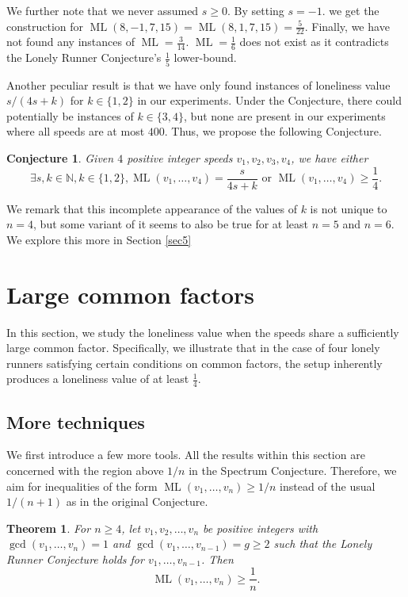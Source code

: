 \documentclass[11pt]{amsart}
\newtheorem{theorem}{Theorem}[section]
\newtheorem{conj}{Conjecture}[section]
\DeclareMathOperator{\ML}{ML}
\begin{document}
 \par We further note that we never assumed $s \geq 0$. By setting $s = -1$. we get the construction for $\ML(8, -1, 7, 15) = \ML(8, 1, 7, 15) = \frac{5}{22}$. Finally, we have not found any instances of $\ML = \frac{3}{14}$. $\ML = \frac{1}{6}$ does not exist as it contradicts the Lonely Runner Conjecture's $\frac{1}{5}$ lower-bound.
\par Another peculiar result is that we have only found instances of loneliness value $s / (4s + k)$ for $k \in \{1,2\}$ in our experiments. Under the Conjecture, there could potentially be instances of $k \in \{3,4\}$, but none are present in our experiments where all speeds are at most $400$. Thus, we propose the following Conjecture.
\begin{conj}
\label{con3}
    Given $4$ positive integer speeds $v_1,v_2,v_3,v_4$, we have either
    $$\exists s,k \in \mathbb{N},k \in \{1,2\}, \ML(v_1,\ldots,v_4) = \frac{s}{4s + k} \text{ or } \ML(v_1,\ldots,v_4) \geq \frac{1}{4}.$$
\end{conj}
We remark that this incomplete appearance of the values of $k$ is not unique to $n = 4$, but some variant of it seems to also be true for at least $n = 5$ and $n = 6$. We explore this more in Section \ref{sec5}

\section{Large common factors}
\label{sec4}
In this section, we study the loneliness value when the speeds share a sufficiently large common factor. Specifically, we illustrate that in the case of four lonely runners satisfying certain conditions on common factors, the setup inherently produces a loneliness value of at least $\frac{1}{4}$. 

\subsection{More techniques}
\par We first introduce a few more tools. All the results within this section are concerned with the region above $1/n$ in the Spectrum Conjecture. Therefore, we aim for inequalities of the form $\ML(v_1, \ldots, v_n) \geq 1/n$ instead of the usual $1/(n+1)$ as in the original Conjecture.
\begin{theorem}
\label{the1}
    For $n \geq 4$, let $v_1, v_2, \ldots, v_n$ be positive integers with $\gcd(v_1,\ldots, v_n) = 1$ and $\gcd(v_1,\ldots,v_{n-1}) = g \geq 2$ such that the Lonely Runner Conjecture holds for $v_1, \ldots, v_{n-1}$. Then
    $$\ML(v_1,\ldots,v_n) \geq \frac{1}{n}.$$
\end{theorem}
\end{document}
